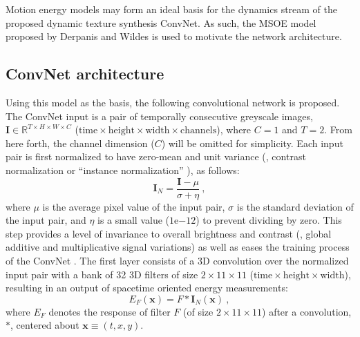Motion energy models may form an ideal basis for the dynamics stream of the proposed dynamic texture synthesis ConvNet. As such, the MSOE model proposed by Derpanis and Wildes \cite{derpanis2012spacetime} is used to motivate the network architecture.

\subsection{ConvNet architecture}

Using this model as the basis, the following convolutional 
network is proposed.
The ConvNet input is a pair of temporally consecutive greyscale images, $\mathbf{I} \in \mathbb{R}^{T \times H \times W \times C}$ ($\text{time} \times \text{height} \times \text{width} \times \text{channels}$), where $C=1$ and $T=2$. From here forth, the channel dimension ($C$) will be omitted for simplicity.
Each input pair is first normalized to have zero-mean and unit
variance (\ie, contrast normalization or ``instance normalization'' \cite{ulyanov2017}), as follows:
\begin{equation}
	\mathbf{I}_N = \frac{\mathbf{I} - \mu}{\sigma + \eta}\ ,
\end{equation}
where $\mu$ is the average pixel value of the input pair, $\sigma$ is the standard deviation of the input pair, and $\eta$ is a small value ($1\mathrm{e}{-12}$) to prevent dividing by zero.
This step provides a level of invariance to overall brightness and contrast (\ie, global additive and
multiplicative signal variations) as well as eases the training process of the ConvNet \cite{lecun1998}.
The first layer consists of a 3D convolution over the normalized input pair with a bank of 32 3D filters of size $2 \times 11 \times 11$
($\text{time} \times \text{height} \times \text{width}$), resulting in an output of spacetime oriented energy measurements:
\begin{equation}
	E_F(\mathbf{x}) = F * \mathbf{I}_N(\mathbf{x})\ ,
\end{equation}
where $E_F$ denotes the response of filter $F$ (of size $2 \times 11 \times 11$) after a convolution, $*$, centered about $\mathbf{x} \equiv (t, x, y)$.
